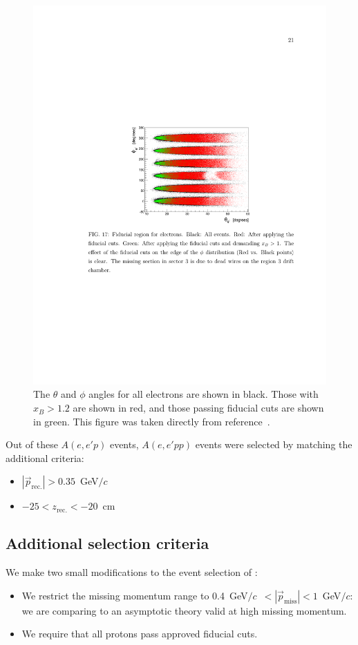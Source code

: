 \documentclass{article}
\begin{document}
\begin{figure}[htpb]
\centering
\includegraphics{or_note_figs/e_fid.pdf}
\caption[Electron fiducial cuts]{
The $\theta$ and $\phi$ angles for all electrons are shown in black. Those with
$x_B>1.2$ are shown in red, and those passing fiducial cuts are shown in green.
This figure was taken directly from reference~\cite{Or:note}.
\label{fig:e_fid}}
\end{figure}

Out of these $A(e,e'p)$ events, $A(e,e'pp)$ events were selected by matching the additional criteria:
\begin{itemize}
\item $|\vec{p}_\text{rec.}| > 0.35$~GeV$/c$
\item $-25 < z_\text{rec.} < -20$~cm
\end{itemize}

\subsection{Additional selection criteria}
We make two small modifications to the event selection of \cite{Or:note}:
\begin{itemize}
\item We restrict the missing momentum range to 0.4~GeV$/c$~$< |\vec{p}_\text{miss}| < 1$~GeV$/c$:
  we are comparing to an asymptotic theory valid at high missing momentum.
\item We require that all protons pass approved fiducial cuts.
\end{itemize}
\end{document}
